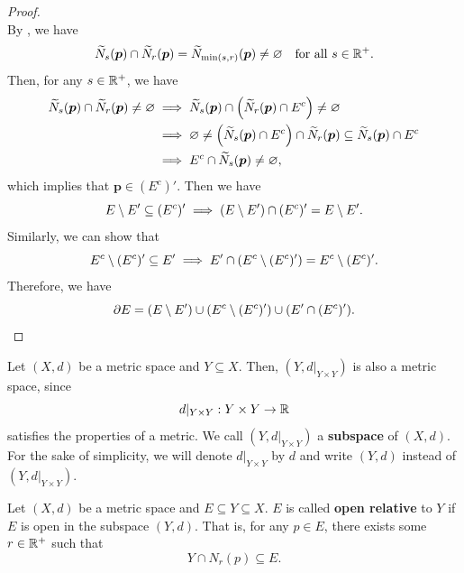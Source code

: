 \begin{proof}
\[    \]
    By , we have
    \[
    \widetilde{N}_{s}(\bm{p}) \cap \widetilde{N}_{r}(\bm{p}) = \widetilde{N}_{\min(s,r)}(\bm{p}) \neq \vnot\quad \text{for all } s \in \R^{+}.
    \]
    Then, for any $s \in \R^{+}$, we have
    \begin{align*}
        \widetilde{N}_{s}(\bm{p}) \cap \widetilde{N}_{r}(\bm{p}) \neq \vnot &\implies \widetilde{N}_{s}(\bm{p}) \cap
        \paren*{\widetilde{N}_{r}(\bm{p}) \cap E^{c}} \neq \vnot \\
        &\implies \vnot \neq \paren*{\widetilde{N}_{s}(\bm{p}) \cap E^{c}} \cap \widetilde{N}_{r}(\bm{p})
        \subseteq \widetilde{N}_{s}(\bm{p}) \cap E^{c} \\
        &\implies E^{c} \cap \widetilde{N}_{s}(\bm{p}) \neq \vnot,
    \end{align*}
    which implies that $\bm{p} \in (E^{c})'$. Then we have
    \[
    E \setminus E' \subseteq (E^{c})' \implies \paren*{E \setminus E'} \cap (E^{c})' = E \setminus E'.
    \]
    Similarly, we can show that
    \[
    E^{c} \setminus (E^{c})' \subseteq E' \implies E' \cap \paren*{E^{c} \setminus (E^{c})'} = E^{c} \setminus (E^{c})'.
    \]
    Therefore, we have
    \[
    \partial E = \paren*{E \setminus E'} \cup \paren*{E^{c} \setminus (E^{c})'} \cup \paren*{E' \cap (E^{c})'}.
    \]
\end{proof}

\bigskip

\begin{remark}
    Let $(X, d)$ be a metric space and $Y \subseteq X$. Then, $(Y, d|_{Y \times Y})$ is also a metric space, since
    \[
    d|_{Y \times Y}: Y \times Y \to \R
    \]
    satisfies the properties of a metric. We call $(Y, d|_{Y \times Y})$ a \textbf{subspace} of $(X, d)$. For the
    sake of simplicity, we will denote $d|_{Y \times Y}$ by $d$ and write $(Y, d)$ instead of $(Y, d|_{Y \times Y})$.
\end{remark}

\bigskip

\begin{definition} \label{def:OpenSetRelativeToSubspace}
    Let $(X, d)$ be a metric space and $E \subseteq Y \subseteq X$. $E$ is called \textbf{open relative} to $Y$
    if $E$ is open in the subspace $(Y, d)$. That is, for any $p \in E$, there exists some $r \in \R^{+}$ such that 
    \[
    Y \cap N_{r}(p) \subseteq E.
    \]
\end{definition}

\bigskip

